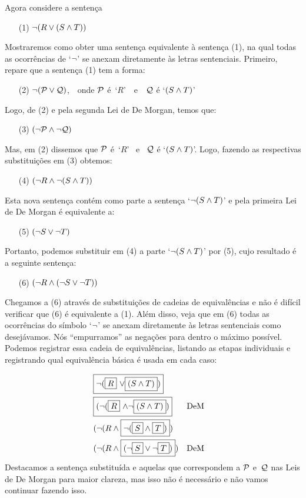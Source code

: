 Agora considere a sentença
\begin{itemize}
	\item[(1)]   $\neg(R \vee (S \wedge T))$
\end{itemize}
Mostraremos  como obter uma sentença equivalente  à sentença (1), na qual todas as ocorrências de `$\neg$' se anexam diretamente às letras sentenciais. Primeiro, repare que a sentença (1) tem a forma: 
\begin{itemize}
	\item[(2)]   $\neg(\mathcal{P} \vee \mathcal{Q})$,  \,\,  onde $\mathcal{P}$ é~`$R$' \,\, e \,\, $\mathcal{Q}$ é `$(S \wedge T)$' 
\end{itemize}
Logo, de (2) e pela segunda Lei de De Morgan, temos que:
\begin{itemize}
	\item[(3)]    $(\neg \mathcal{P} \wedge \neg \mathcal{Q})$
\end{itemize}
Mas,  em (2)  dissemos que  $\mathcal{P}$ é~`$R$' \, e \, $\mathcal{Q}$ é `$(S \wedge T)$'. Logo, fazendo as respectivas substituições em (3) obtemos:
\begin{itemize}
	\item[(4)]   $(\neg R \wedge \neg (S \wedge T))$ 
\end{itemize}
Esta nova sentença contém como parte a sentença `$\neg (S \wedge T)$’ e   pela primeira Lei de De Morgan é equivalente a:
\begin{itemize}
	\item[(5)]     $(\neg S \vee \neg T)$
\end{itemize}
Portanto, podemos substituir em (4) a parte `$\neg (S \wedge T)$' por (5), cujo resultado é a seguinte  sentença:
\begin{itemize}
	\item[(6)]    $(\neg R \wedge (\neg S \vee \neg T))$
\end{itemize}
Chegamos a (6) através de substituições de cadeias de equivalências e não é difícil verificar que (6) é equivalente a (1). Além disso,  veja que em (6) todas as ocorrências do símbolo `$\neg$' se anexam diretamente às letras  sentenciais como desejávamos. Nós  ``empurramos''  as negações para dentro o máximo possível. Podemos registrar essa cadeia de equivalências, listando as etapas individuais e registrando qual equivalência básica é usada em cada caso:

\begin{align*}
	& \fbox{\ensuremath{\neg}(\fbox{$R$} \ensuremath{\vee}\fbox{$(S \wedge T)$})} \\
	& \fbox{(\ensuremath{\neg}(\fbox{$R$} \ensuremath{\wedge}\ensuremath{\neg}\fbox{$(S \wedge T)$})} && \text{DeM}\\
	& (\neg(R \wedge \fbox{$\neg(\fbox{$S$} \wedge \fbox{$T$})$}) \\
	& (\neg(R \wedge \fbox{$(\neg \fbox{$S$} \vee \neg \fbox{$T$})$}) && \text{DeM}
\end{align*}
Destacamos a sentença substituída e aquelas que correspondem a $\mathcal{P}$ e~$\mathcal{Q}$ nas Leis de De Morgan para maior clareza, mas isso não é necessário e não vamos continuar fazendo isso.


